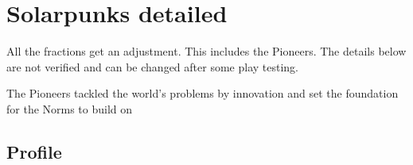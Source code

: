 \chapter {Solarpunks detailed}


\begin{warning}
    All the fractions get an adjustment. This includes the Pioneers. The details below are not verified and can be changed after some play testing.

\end{warning}

The Pioneers tackled the world's problems by innovation and set the foundation for the Norms to build on

\section{Profile}
